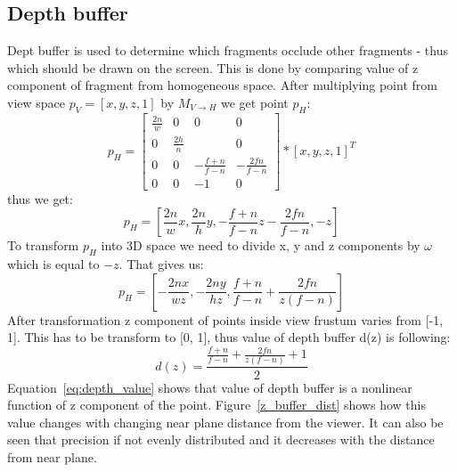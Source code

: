 \subsection{Depth buffer}
Dept buffer is used to determine which fragments occlude other fragments - thus which should be drawn on the screen. This is done by comparing value of z component of fragment from homogeneous space. 
After multiplying point from view space $p_V = [x, y, z, 1]$  by $M_{V \to H}$ we get point $p_H$:
\begin{equation}
\label{eg:projection_transformation}
p_H =
\begin{bmatrix}
\frac{2n}{w} & 0            & 0                & 0                \\ 
0            & \frac{2h}{n} &                  & 0                 \\ 
0            & 0            & -\frac{f+n}{f-n} & -\frac{2fn}{f-n} \\ 
0            & 0            & -1               & 0
\end{bmatrix}
*[x, y, z, 1]^T
\end{equation}
thus we get:
\begin{equation}
\label{eg:after_perspective_projection}
p_H = [\frac{2n}{w}x, \frac{2n}{h}y, -\frac{f+n}{f-n}z - \frac{2fn}{f-n}, -z]
\end{equation}
To transform $p_H$ into 3D space we need to divide x, y and z components by $\omega$ which is equal to $-z$. That gives us:
\begin{equation}
\label{eg:after_perspective_projection}
p_H = [-\frac{2nx}{wz},-\frac{2ny}{hz}, \frac{f+n}{f-n} + \frac{2fn}{z(f-n)}]
\end{equation}
After transformation z component of points inside view frustum varies from [-1, 1]. This has to be transform to [0, 1], thus value of depth buffer d(z) is following:
\begin{equation}
\label{eq:depth_value}
d(z) = \frac{\frac{f+n}{f-n} + \frac{2fn}{z(f-n)} + 1}{2}
\end{equation}
Equation~\ref{eq:depth_value} shows that value of depth buffer is a nonlinear function of z component of the point. Figure~\ref{z_buffer_dist} shows how this value changes with changing near plane distance from the viewer. It can also be seen that precision if not evenly distributed and it decreases with the distance from near plane. 



